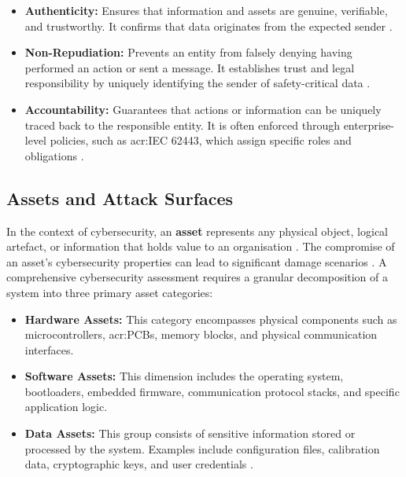 \begin{itemize}
	\item \textbf{Authenticity:} Ensures that information and assets are genuine, verifiable, and trustworthy. It confirms that data originates from the expected sender \cite[p. 102]{doCarmo2025}.
	\item \textbf{Non-Repudiation:} Prevents an entity from falsely denying having performed an action or sent a message. It establishes trust and legal responsibility by uniquely identifying the sender of safety-critical data \cite[pp. 102]{doCarmo2025}.
	\item \textbf{Accountability:} Guarantees that actions or information can be uniquely traced back to the responsible entity. It is often enforced through enterprise-level policies, such as \gls{acr:IEC} 62443, which assign specific roles and obligations \cite[p. 103]{doCarmo2025}.
\end{itemize}

\subsection{Assets and Attack Surfaces} 
\label{subsec:assets_attack_surfaces}

In the context of cybersecurity, an \textbf{asset} represents any physical object, logical artefact, or information that holds value to an organisation \cite[p. 85]{doCarmo2025} \cite[p. 5]{Wurm2022}. The compromise of an asset's cybersecurity properties can lead to significant damage scenarios \cite[p. 85]{doCarmo2025}. A comprehensive cybersecurity assessment requires a granular decomposition of a system into three primary asset categories:

\begin{itemize}
	\item \textbf{Hardware Assets:} This category encompasses physical components such as microcontrollers, \glspl{acr:PCB}, memory blocks, and physical communication interfaces.
	\item \textbf{Software Assets:} This dimension includes the operating system, bootloaders, embedded firmware, communication protocol stacks, and specific application logic.
	\item \textbf{Data Assets:} This group consists of sensitive information stored or processed by the system. Examples include configuration files, calibration data, cryptographic keys, and user credentials \cite[pp. 85]{doCarmo2025} \cite[p. 5]{Wurm2022} \cite[p. 3]{liebl2024analyzingattacksurfacethreats}.
\end{itemize}

